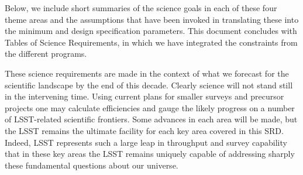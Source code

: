 Below, we include short summaries of the science goals in each of these four
theme areas and the assumptions that have been invoked in translating these
into the minimum and design specification parameters.  This document concludes
with Tables of Science Requirements, in which we have integrated the
constraints from the different programs.

These science requirements are made in the context of what we forecast for
the scientific landscape by the end of this decade. Clearly science will not stand still in the
intervening time.  Using current plans for smaller surveys and precursor projects
one may calculate efficiencies and gauge the likely progress on a number of
LSST-related scientific frontiers. Some advances in each area will be made,
but the LSST remains the ultimate facility for each key area covered in this SRD.
Indeed, LSST represents such a large leap in throughput and survey capability
that in these key areas the LSST remains uniquely capable of addressing sharply
these fundamental questions about our universe.
